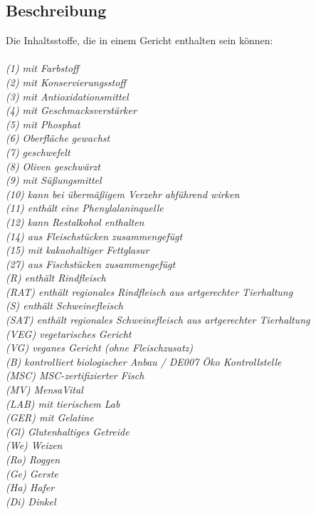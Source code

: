 \documentclass[a4paper]{scrreprt}
\begin{document}
\subsection*{Beschreibung}
Die Inhaltsstoffe, die in einem Gericht enthalten sein können: \\
\\
\textit{(1) mit Farbstoff \\
(2) mit Konservierungsstoff \\
(3) mit Antioxidationsmittel \\
(4) mit Geschmacksverstärker \\
(5) mit Phosphat \\
(6) Oberfläche gewachst \\
(7) geschwefelt \\
(8) Oliven geschwärzt \\
(9) mit Süßungsmittel \\
(10) kann bei übermäßigem Verzehr abführend wirken \\
(11) enthält eine Phenylalaninquelle \\
(12) kann Restalkohol enthalten \\
(14) aus Fleischstücken zusammengefügt \\
(15) mit kakaohaltiger Fettglasur \\
(27) aus Fischstücken zusammengefügt \\
(R) enthält Rindfleisch \\
(RAT) enthält regionales Rindfleisch aus artgerechter Tierhaltung \\
(S) enthält Schweinefleisch \\
(SAT) enthält regionales Schweinefleisch aus artgerechter Tierhaltung \\
(VEG) vegetarisches Gericht \\
(VG) veganes Gericht (ohne Fleischzusatz) \\
(B) kontrolliert biologischer Anbau / DE007 Öko Kontrollstelle \\
(MSC) MSC-zertifizierter Fisch \\
(MV) MensaVital \\
(LAB) mit tierischem Lab \\
(GER) mit Gelatine\\
(Gl) Glutenhaltiges Getreide \\
(We) Weizen \\
(Ro) Roggen \\
(Ge) Gerste \\
(Ha) Hafer \\
(Di) Dinkel \\
}
\end{document}
